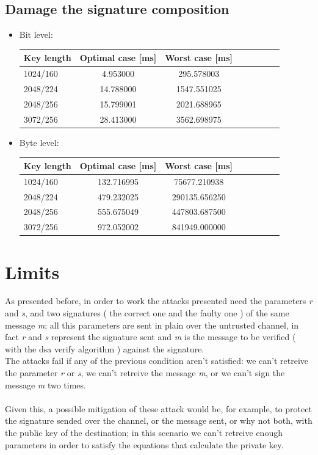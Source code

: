 \documentclass[11pt,english]{article}
\begin{document}
\subsection{Damage the signature composition}
\begin{itemize}
\item Bit level:

\begin{center}
\begin{tabular}{l*{6}{c}r}
Key length        & Optimal case [ms] & Worst case [ms] \\
\hline
1024/160 &        4.953000 & 295.578003  \\
2048/224 &       14.788000 & 1547.551025  \\
2048/256 &       15.799001 & 2021.688965  \\
3072/256 &       28.413000 & 3562.698975  \\ 
\end{tabular}
\end{center}

\item Byte level:

\begin{center}
\begin{tabular}{l*{6}{c}r}
Key length        & Optimal case [ms] & Worst case [ms] \\
\hline
1024/160 &        132.716995 & 75677.210938  \\
2048/224 &        479.232025 & 290135.656250  \\
2048/256 &       555.675049  & 447803.687500  \\
3072/256 &       972.052002  & 841949.000000  \\ 
\end{tabular}
\end{center}

\end{itemize}

\section{Limits}
As presented before, in order to work the attacks presented need the parameters \textit{r} and \textit{s}, and two signatures ( the correct one and the faulty one ) of the same message \textit{m}; all this parameters are sent in plain over the untrusted channel, in fact \textit{r} and \textit{s} represent the signature sent and \textit{m} is the message to be verified ( with the dsa verify algorithm ) against the signature.\\
The attacks fail if any of the previous condition aren't satisfied: we can't retreive the parameter \textit{r} or \textit{s}, we can't retreive the message \textit{m}, or we can't sign the message \textit{m} two times.\\\\
Given this, a possible mitigation of these attack would be, for example, to protect the signature sended over the channel, or the  message sent, or why not both, with the public key of the destination; in this scenario we can't retreive enough parameters in order to satisfy the equations that calculate the private key.
\end{document}
